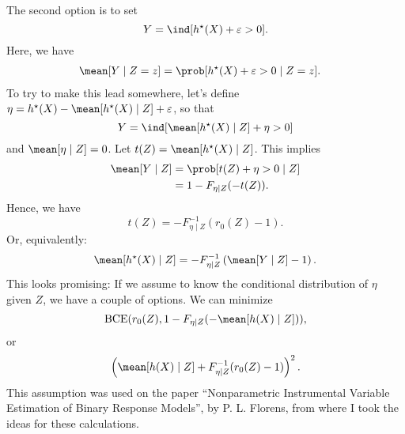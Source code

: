 The second option is to set
\begin{equation}
    \label{Y is indicator}
    Y = \ind [ \hstar ( X ) + \varepsilon > 0 ]
.\end{equation}
Here, we have
\begin{align}
    \mean [ Y \mid Z = z ]
    &= \prob [ \hstar ( X ) + \varepsilon > 0 \mid Z = z ]
.\end{align}
To try to make this lead somewhere, let's define $ \eta = \hstar ( X ) - \mean [ \hstar ( X ) \mid Z ] + \varepsilon $, so that
\begin{equation*}
    Y = \ind [ \mean [ \hstar ( X ) \mid Z ] + \eta > 0]
\end{equation*}
and $ \mean [ \eta \mid Z ] = 0 $.
Let $ t ( Z ) = \mean [ \hstar ( X ) \mid Z ] $.
This implies
\begin{align*}
    \mean [ Y \mid Z ]
    &= \prob [ t ( Z ) + \eta > 0 \mid Z ] \\
    &= 1 - F_{ \eta \mid Z } ( - t ( Z ) )
.\end{align*}
Hence, we have
\begin{equation*}
    t ( Z ) = - F_{ \eta \mid Z }^{ -1 } ( r_{ 0 } ( Z ) - 1 )
.\end{equation*}
Or, equivalently:
\begin{equation*}
    \mean [ \hstar ( X ) \mid Z ] = - F^{ -1 }_{ \eta \mid Z } \left( \mean [ Y \mid Z ] - 1 \right)
.\end{equation*}
This looks promising:
If we assume to know the conditional distribution of $ \eta $ given $ Z $, we have a couple of options.
We can minimize
\begin{equation*}
    \BCE ( r_{ 0 } ( Z ) , 1 - F_{ \eta \mid Z } ( - \mean [ h ( X ) \mid Z ] ) )
,\end{equation*}
or
\begin{equation*}
     \left( \mean [ h ( X ) \mid Z ] + F_{ \eta \mid Z }^{ -1 } ( r_{ 0 } ( Z ) - 1 ) \right)^2
.\end{equation*}
This assumption was used on the paper ``Nonparametric Instrumental Variable Estimation of Binary Response Models'', by P. L. Florens, from where I took the ideas for these calculations.

